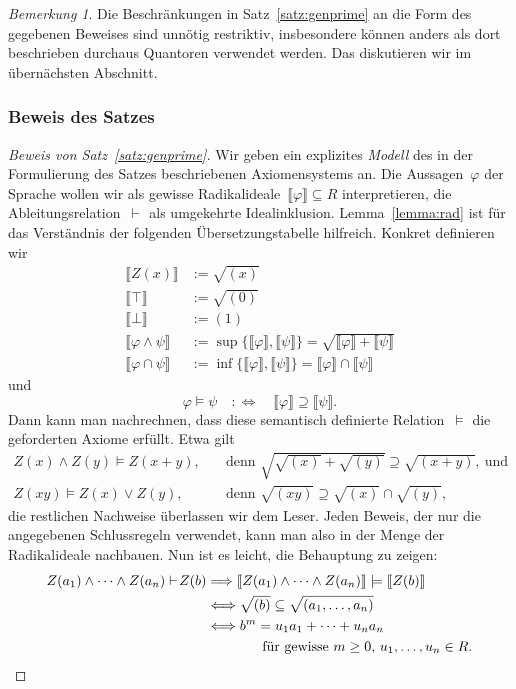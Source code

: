 \documentclass[a4paper,ngerman,12pt]{scrartcl}
\theoremstyle{definition}
\theoremstyle{plain}
\theoremstyle{remark}
\newtheorem{bem}[defn]{Bemerkung}
\newcommand{\brak}[1]{\llbracket {#1} \rrbracket}
\newcommand{\seq}[1]{\mathrel{\vdash\!\!\!_{#1}}}
\renewcommand{\_}{\mathpunct{.}\,}
\newcommand{\?}{\,{:}\,}
\begin{document}
\begin{bem}Die Beschränkungen in Satz~\ref{satz:genprime} an die Form des
gegebenen Beweises sind unnötig restriktiv, insbesondere können anders als dort
beschrieben durchaus Quantoren verwendet werden. Das diskutieren wir im
übernächsten Abschnitt.\end{bem}


\subsubsection*{Beweis des Satzes}

\begin{proof}[Beweis von Satz~\ref{satz:genprime}]
Wir geben ein explizites \emph{Modell} des in der Formulierung des Satzes
beschriebenen Axiomensystems an. Die Aussagen~$\varphi$ der Sprache wollen wir als
gewisse Radikalideale~$\brak{\varphi} \subseteq R$ interpretieren, die
Ableitungsrelation~$\seq{}$ als umgekehrte Idealinklusion.
Lemma~\ref{lemma:rad} ist für das Verständnis der folgenden Übersetzungstabelle
hilfreich. Konkret definieren wir
\begin{align*}
  \brak{Z(x)} &:= \sqrt{(x)} \\
  \brak{\top} &:= \sqrt{(0)} \\
  \brak{\bot} &:= (1) \\
  \brak{\varphi \wedge \psi} &:= \sup\{\brak{\varphi},\brak{\psi}\} = \sqrt{\brak{\varphi} + \brak{\psi}} \\
  \brak{\varphi \cap \psi} &:= \inf\{\brak{\varphi},\brak{\psi}\} = \brak{\varphi} \cap \brak{\psi}
\end{align*}
und
\[ \varphi \models \psi \quad:\Longleftrightarrow\quad
  \brak{\varphi} \supseteq \brak{\psi}. \]
Dann kann man nachrechnen, dass diese semantisch definierte Relation~$\models$
die geforderten Axiome erfüllt. Etwa gilt
\begin{align*}
  Z(x) \wedge Z(y) \models Z(x+y), &
    \quad\text{denn } \sqrt{\sqrt{(x)} + \sqrt{(y)}} \supseteq \sqrt{(x+y)},\ \text{und} \\
  Z(xy) \models Z(x) \vee Z(y), &
    \quad\text{denn } \sqrt{(xy)} \supseteq \sqrt{(x)} \cap \sqrt{(y)},
\end{align*}
die restlichen Nachweise überlassen wir dem Leser. Jeden Beweis, der nur die
angegebenen Schlussregeln verwendet, kann man also in der Menge der
Radikalideale nachbauen. Nun ist es leicht, die Behauptung zu zeigen:
\begin{align*}
  Z(a_1) \wedge \cdots \wedge Z(a_n) \seq{} Z(b)
  &\Longrightarrow
  \brak{Z(a_1) \wedge \cdots \wedge Z(a_n)} \models \brak{Z(b)} \\
  &\Longleftrightarrow
  \sqrt{(b)} \subseteq \sqrt{(a_1,\ldots,a_n)} \\
  &\Longleftrightarrow
  b^m = u_1 a_1 + \cdots + u_n a_n \\
  &\qquad\qquad
    \text{für gewisse~$m \geq 0$, $u_1,\ldots,u_n \in R$.} \qedhere
\end{align*}
\end{proof}
\end{document}
